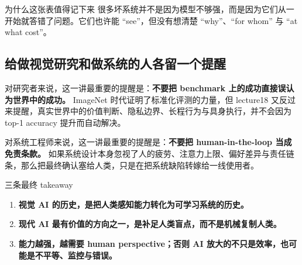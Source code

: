 \begin{table}[H]
\centering
\small
\renewcommand{\arraystretch}{1.18}
\caption{lecture18 的三层问题可以直接转成系统设计审查表}
\end{table}

\begin{knowledgebox}{为什么这张表值得记下来}
很多坏系统并不是因为模型不够强，而是因为它们从一开始就答错了问题。它们也许能 ``see''，但没有想清楚 ``why''、``for whom'' 与 ``at what cost''。
\end{knowledgebox}

\subsection{给做视觉研究和做系统的人各留一个提醒}

对研究者来说，这一讲最重要的提醒是：\textbf{不要把 benchmark 上的成功直接误认为世界中的成功。} ImageNet 时代证明了标准化评测的力量，但 lecture18 又反过来提醒，真实世界中的价值判断、隐私边界、长程行为与具身执行，并不会因为 top-1 accuracy 提升而自动解决。

对系统工程师来说，这一讲最重要的提醒是：\textbf{不要把 human-in-the-loop 当成免责条款。} 如果系统设计本身忽视了人的疲劳、注意力上限、偏好差异与责任链条，那么把最终确认塞给人类，只是在把系统缺陷转嫁给一线使用者。

\begin{importantbox}{三条最终 takeaway}
\begin{enumerate}
    \item \textbf{视觉 AI 的历史，是把人类感知能力转化为可学习系统的历史。}
    \item \textbf{现代 AI 最有价值的方向之一，是补足人类盲点，而不是机械复制人类。}
    \item \textbf{能力越强，越需要 human perspective；否则 AI 放大的不只是效率，也可能是不平等、监控与错误。}
\end{enumerate}
\end{importantbox}

